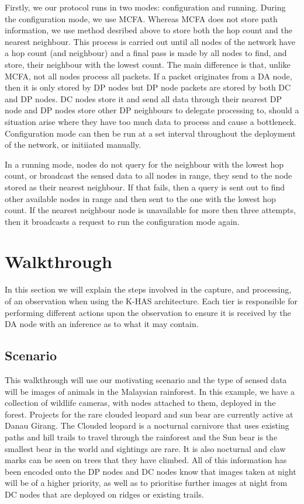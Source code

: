 		Firstly, we our protocol runs in two modes: configuration and running. During the configuration mode, we use MCFA. Whereas MCFA does not store path information, we use method desribed above to store both the hop count and the nearest neighbour. This process is carried out until all nodes of the network have a hop count (and neighbour) and a final pass is made by all nodes to find, and store, their neighbour with the lowest count. The main difference is that, unlike MCFA, not all nodes process all packets. If a packet originates from a DA node, then it is only stored by DP nodes but DP node packets are stored by both DC and DP nodes. DC nodes store it and send all data through their nearest DP node and DP nodes store other DP neighbours to delegate processing to, should a situation arise where they have too much data to process and cause a bottleneck. Configuration mode can then be run at a set interval throughout the deployment of the network, or initiiated manually.

		In a running mode, nodes do not query for the neighbour with the lowest hop count, or broadcast the sensed data to all nodes in range, they send to the node stored as their nearest neighbour. If that fails, then a query is sent out to find other available nodes in range and then sent to the one with the lowest hop count. If the nearest neighbour node is unavailable for more then three attempts, then it broadcasts a request to run the configuration mode again.

	
	\section{Walkthrough}\label{arch:walk}
		In this section we will explain the steps involved in the capture, and processing, of an observation when using the K-HAS architecture. Each tier is responsible for performing different actions upon the observation to ensure it is received by the DA node with an inference as to what it may contain.
		
		\subsection{Scenario}
			This walkthrough will use our motivating scenario and the type of sensed data will be images of animals in the Malaysian rainforest. In this example, we have a collection of wildlife cameras, with nodes attached to them, deployed in the forest. Projects for the rare clouded leopard and sun bear are currently active at Danau Girang. The Clouded leopard is a nocturnal carnivore that uses existing paths and hill trails to travel through the rainforest and the Sun bear is the smallest bear in the world and sightings are rare. It is also nocturnal and claw marks can be seen on trees that they have climbed. All of this information has been encoded onto the DP nodes and DC nodes know that images taken at night will be of a higher priority, as well as to prioritise further images at night from DC nodes that are deployed on ridges or existing trails.
			
